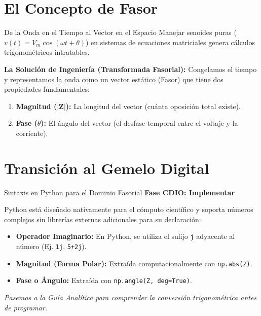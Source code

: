 \documentclass[aspectratio=169]{beamer}
\begin{document}
\section{El Concepto de Fasor}
\begin{frame}{De la Onda en el Tiempo al Vector en el Espacio}
    Manejar senoides puras ($v(t) = V_m \cos(\omega t + \theta)$) en sistemas de ecuaciones matriciales genera cálculos trigonométricos intratables.
    
    \vspace{0.3cm}
    \textbf{La Solución de Ingeniería (Transformada Fasorial):}
    Congelamos el tiempo y representamos la onda como un vector estático (Fasor) que tiene dos propiedades fundamentales:
    \begin{enumerate}
        \item \textbf{Magnitud ($|\mathbf{Z}|$):} La longitud del vector (cuánta oposición total existe).
        \item \textbf{Fase ($\theta$):} El ángulo del vector (el desfase temporal entre el voltaje y la corriente).
    \end{enumerate}
\end{frame}

\section{Transición al Gemelo Digital}
\begin{frame}{Sintaxis en Python para el Dominio Fasorial}
    \textbf{Fase CDIO: Implementar}
    
    \vspace{0.3cm}
    Python está diseñado nativamente para el cómputo científico y soporta números complejos sin librerías externas adicionales para su declaración:
    \begin{itemize}
        \item \textbf{Operador Imaginario:} En Python, se utiliza el sufijo \texttt{j} adyacente al número (Ej. \texttt{1j}, \texttt{5+2j}).
        \item \textbf{Magnitud (Forma Polar):} Extraída computacionalmente con \texttt{np.abs(Z)}.
        \item \textbf{Fase o Ángulo:} Extraída con \texttt{np.angle(Z, deg=True)}.
    \end{itemize}
    
    \vspace{0.5cm}
    \begin{center}
        \textit{Pasemos a la Guía Analítica para comprender la conversión trigonométrica antes de programar.}
    \end{center}
\end{frame}
\end{document}
